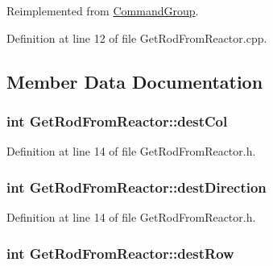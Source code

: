 Reimplemented from \hyperlink{classCommandGroup_a99800c5dbd05ab750aa0bb27518d0467}{Command\-Group}.



Definition at line 12 of file Get\-Rod\-From\-Reactor.\-cpp.



\subsection{Member Data Documentation}
\hypertarget{classGetRodFromReactor_a375425052a9973441a9a990f79fedd93}{
\subsubsection[{dest\-Col}]{\setlength{\rightskip}{0pt plus 5cm}int Get\-Rod\-From\-Reactor\-::dest\-Col\hspace{0.3cm}{\ttfamily [private]}}}\label{classGetRodFromReactor_a375425052a9973441a9a990f79fedd93}


Definition at line 14 of file Get\-Rod\-From\-Reactor.\-h.

\hypertarget{classGetRodFromReactor_a04f79f55c3202c51136455a9c29b7273}{
\subsubsection[{dest\-Direction}]{\setlength{\rightskip}{0pt plus 5cm}int Get\-Rod\-From\-Reactor\-::dest\-Direction\hspace{0.3cm}{\ttfamily [private]}}}\label{classGetRodFromReactor_a04f79f55c3202c51136455a9c29b7273}


Definition at line 14 of file Get\-Rod\-From\-Reactor.\-h.

\hypertarget{classGetRodFromReactor_a6e7a2b3591016b6c7fec6b908fd0a3e7}{
\subsubsection[{dest\-Row}]{\setlength{\rightskip}{0pt plus 5cm}int Get\-Rod\-From\-Reactor\-::dest\-Row\hspace{0.3cm}{\ttfamily [private]}}}\label{classGetRodFromReactor_a6e7a2b3591016b6c7fec6b908fd0a3e7}


